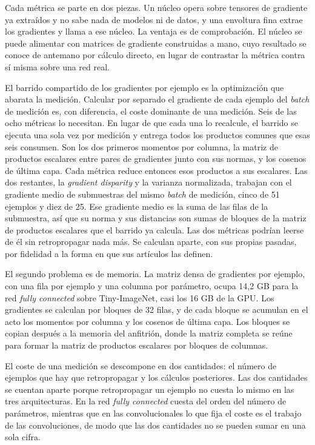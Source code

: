 Cada métrica se parte en dos piezas. Un núcleo opera sobre tensores de gradiente ya extraídos y no sabe nada de modelos ni de datos, y una envoltura fina extrae los gradientes y llama a ese núcleo. La ventaja es de comprobación. El núcleo se puede alimentar con matrices de gradiente construidas a mano, cuyo resultado se conoce de antemano por cálculo directo, en lugar de contrastar la métrica contra sí misma sobre una red real.

El barrido compartido de los gradientes por ejemplo es la optimización que abarata la medición. Calcular por separado el gradiente de cada ejemplo del \emph{batch} de medición es, con diferencia, el coste dominante de una medición. Seis de las ocho métricas lo necesitan. En lugar de que cada una lo recalcule, el barrido se ejecuta una sola vez por medición y entrega todos los productos comunes que esas seis consumen. Son los dos primeros momentos por columna, la matriz de productos escalares entre pares de gradientes junto con sus normas, y los cosenos de última capa. Cada métrica reduce entonces esos productos a sus escalares. Las dos restantes, la \emph{gradient disparity} y la varianza normalizada, trabajan con el gradiente medio de submuestras del mismo \emph{batch} de medición, cinco de 51 ejemplos y diez de 25. Ese gradiente medio es la suma de las filas de la submuestra, así que su norma y sus distancias son sumas de bloques de la matriz de productos escalares que el barrido ya calcula. Las dos métricas podrían leerse de él sin retropropagar nada más. Se calculan aparte, con sus propias pasadas, por fidelidad a la forma en que sus artículos las definen.

El segundo problema es de memoria. La matriz densa de gradientes por ejemplo, con una fila por ejemplo y una columna por parámetro, ocupa 14,2 GB para la red \emph{fully connected} sobre Tiny-ImageNet, casi los 16 GB de la GPU. Los gradientes se calculan por bloques de 32 filas, y de cada bloque se acumulan en el acto los momentos por columna y los cosenos de última capa. Los bloques se copian después a la memoria del anfitrión, donde la matriz completa se reúne para formar la matriz de productos escalares por bloques de columnas.

El coste de una medición se descompone en dos cantidades: el número de ejemplos que hay que retropropagar y los cálculos posteriores. Las dos cantidades se cuentan aparte porque retropropagar un ejemplo no cuesta lo mismo en las tres arquitecturas. En la red \emph{fully connected} cuesta del orden del número de parámetros, mientras que en las convolucionales lo que fija el coste es el trabajo de las convoluciones, de modo que las dos cantidades no se pueden sumar en una sola cifra.


